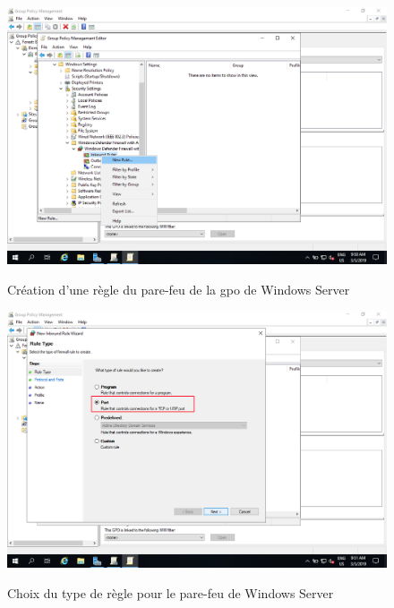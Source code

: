 \begin{figure}[h!]
	\begin{center}
		\caption{Création d'une règle du pare-feu de la gpo de Windows Server}
		\includegraphics[scale=0.5]{WS_Screenshots/gpo_16.png}
		\label{WS_Screenshots/gpo_16}
	\end{center}
\end{figure}
\FloatBarrier 
    

\begin{figure}[h!]
	\begin{center}
		\caption{Choix du type de règle pour le pare-feu de Windows Server}
		\includegraphics[scale=0.5]{WS_Screenshots/gpo_17.png}
		\label{WS_Screenshots/gpo_17}
	\end{center}
\end{figure}
\FloatBarrier 
    

